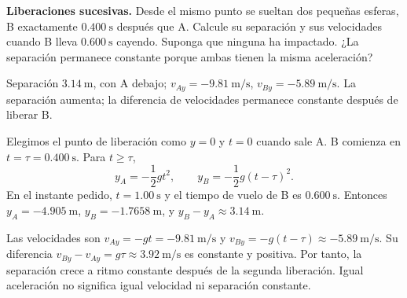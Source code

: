 \begin{ejercicio}
\textbf{Liberaciones sucesivas.} Desde el mismo punto se sueltan dos pequeñas esferas, B exactamente \(\SI{0.400}{\second}\) después que A. Calcule su separación y sus velocidades cuando B lleva \(\SI{0.600}{\second}\) cayendo. Suponga que ninguna ha impactado. ¿La separación permanece constante porque ambas tienen la misma aceleración?
\end{ejercicio}
\begin{respuesta}
Separación \(\SI{3.14}{\meter}\), con A debajo; \(v_{Ay}=-\SI{9.81}{\meter\per\second}\), \(v_{By}=-\SI{5.89}{\meter\per\second}\). La separación aumenta; la diferencia de velocidades permanece constante después de liberar B.
\end{respuesta}
\begin{explicacion}
Elegimos el punto de liberación como \(y=0\) y \(t=0\) cuando sale A. B comienza en \(t=\tau=\SI{0.400}{\second}\). Para \(t\geq\tau\),
\[ y_A=-\frac12gt^2,\qquad y_B=-\frac12g(t-\tau)^2. \]
En el instante pedido, \(t=\SI{1.00}{\second}\) y el tiempo de vuelo de B es \(\SI{0.600}{\second}\). Entonces \(y_A=-\SI{4.905}{\meter}\), \(y_B=-\SI{1.7658}{\meter}\), y \(y_B-y_A\approx\SI{3.14}{\meter}\).

Las velocidades son \(v_{Ay}=-gt=-\SI{9.81}{\meter\per\second}\) y \(v_{By}=-g(t-\tau)\approx-\SI{5.89}{\meter\per\second}\). Su diferencia \(v_{By}-v_{Ay}=g\tau\approx\SI{3.92}{\meter\per\second}\) es constante y positiva. Por tanto, la separación crece a ritmo constante después de la segunda liberación. Igual aceleración no significa igual velocidad ni separación constante.
\end{explicacion}

